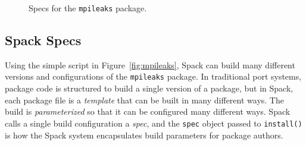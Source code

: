 

\begin{figure}
	\caption{
		Specs for the {\tt mpileaks} package.
		\label{fig:specs}
	}
\end{figure}


\subsection{Spack Specs}\label{sec:specs}

Using the simple script in Figure~\ref{fig:mpileaks}, Spack can build many different
versions and configurations of the {\tt mpileaks} package.  In traditional port systems, 
package code is structured to build a single version of a package, but in Spack, each
package file is a {\it template} that can be built in many different ways.  The build is
{\it parameterized} so that it can be configured many different ways.  
Spack calls a single build configuration a {\it spec},
 and the {\tt spec} object passed to {\tt install()} 
is how the Spack system encapsulates build parameters for package authors.

